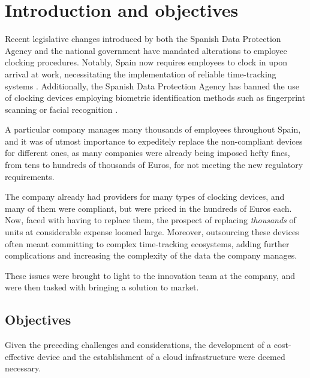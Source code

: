 \chapter{Introduction and objectives}
\label{cap:introduction}


Recent legislative changes introduced by both the Spanish Data Protection Agency and the national government 
have mandated alterations to employee clocking procedures. Notably, Spain now requires employees to clock in 
upon arrival at work, necessitating the implementation of reliable time-tracking systems 
\cite{boe_obligacionfichajes}. Additionally, the Spanish Data Protection Agency has banned the use of clocking 
devices employing biometric identification methods such as fingerprint scanning or facial recognition 
\cite{aepd_prohibicionbiometricos}.

A particular company manages many thousands of employees throughout Spain, and it was of utmost importance
to expeditely replace the non-compliant devices for different ones, as many companies were already being
imposed hefty fines, from tens to hundreds of thousands of Euros, for not meeting the new regulatory 
requirements.

The company already had providers for many types of clocking devices, and many of them were compliant, but 
were priced in the hundreds of Euros each. Now, faced with having to replace them, the prospect of replacing 
\textit{thousands} of units at considerable expense loomed large.  Moreover, outsourcing these devices often 
meant committing to complex time-tracking ecosystems, adding further complications and increasing the
complexity of the data the company manages.

These issues were brought to light to the innovation team at the company, and were then tasked with bringing 
a solution to market.

\section{Objectives}

Given the preceding challenges and considerations, the development of a cost-effective device and the establishment 
of a cloud infrastructure were deemed necessary.

